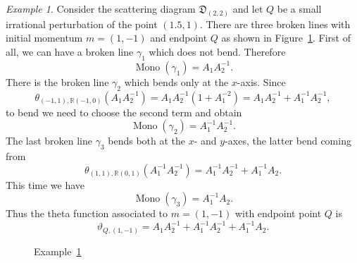\documentclass[11pt]{amsart}
\theoremstyle{remark}
\newtheorem{example}[theorem]{Example}
\numberwithin{equation}{section}
\newcommand{\RR}{\mathbb{R}}
\newcommand{\fD}{\mathfrak{D}}
\newcommand{\Mono}{\operatorname{Mono}}
\begin{document}
\begin{example} 
  \label{brokenex}
  Consider the scattering diagram $\fD_{(2,2)}$ and let $Q$ be a small
  irrational perturbation of the point $(1.5,1)$. There are three broken lines
  with initial momentum $m = (1,-1)$ and endpoint $Q$ as shown in
  Figure~\ref{figbrokenex}.
  First of all, we can have a broken line $\gamma_1$ which does not bend.
  Therefore
  \[
    \Mono(\gamma_1) = A_1 A_2^{-1}.
  \]
  There is the broken line $\gamma_2$  which bends only at the $x$-axis. Since
  \[ 
    \theta_{(-1,1), \RR(-1,0)} (A_1 A_2^{-1}) = 
    A_1 A_2^{-1}(1+A_1^{-2}) =  A_1 A_2^{-1} + A_1^{-1} A_2^{-1},
  \]
  to bend we need to choose the second term and obtain 
  \[
    \Mono(\gamma_2) =  A_1^{-1} A_2^{-1}.
  \]
  The last broken line $\gamma_3$ bends both at the $x$- and $y$-axes, the
  latter bend coming from
  \[ 
    \theta_{ (1,1), \RR (0,1)} ( A_1^{-1} A_2^{-1}) =  
    A_1^{-1} A_2^{-1} + A_1^{-1} A_2.  
  \]
  This time we have 
  \[
    \Mono (\gamma_3) = A_1^{-1} A_2.
  \]
  Thus the theta function associated to $m = (1,-1)$ with endpoint point $Q$ is 
  \[ 
    \vartheta_{Q, (1,-1)} =  
    A_1 A_2^{-1} + A_1^{-1} A_2^{-1} +A_1^{-1} A_2 .  
  \]
\end{example}

\begin{figure}
  \centering
  \caption{Example~\ref{brokenex}} 
  \label{figbrokenex}
\end{figure}
\end{document}
